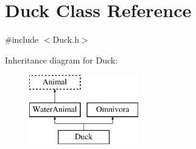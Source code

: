\hypertarget{classDuck}{\section{Duck Class Reference}
\label{classDuck}
}


{\ttfamily \#include $<$Duck.\-h$>$}

Inheritance diagram for Duck\-:\begin{figure}[H]
\begin{center}
\leavevmode
\includegraphics[height=3.000000cm]{classDuck}
\end{center}
\end{figure}
